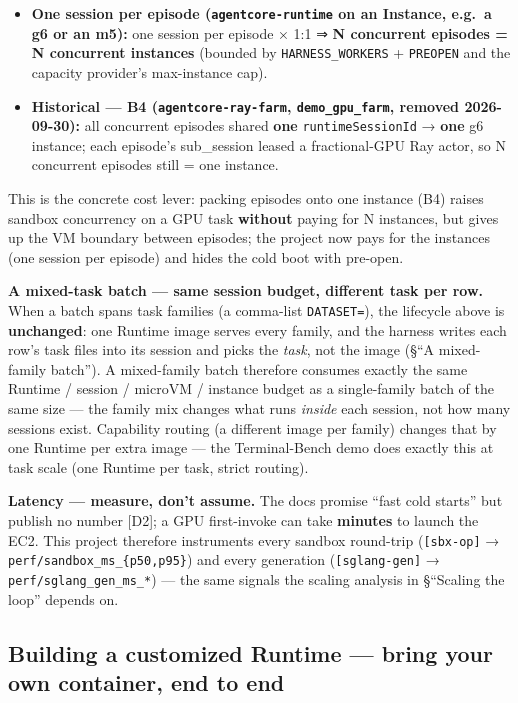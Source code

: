 \documentclass[
  paper=a4,
  ,captions=tableheading
]{scrartcl}
\providecommand{\tightlist}{%
  \setlength{\itemsep}{0pt}\setlength{\parskip}{0pt}}
\begin{document}
\begin{itemize}
\tightlist
\item
  \textbf{One session per episode (\texttt{agentcore-runtime} on an
  Instance, e.g.~a g6 or an m5):} one session per episode × 1:1 ⇒
  \textbf{N concurrent episodes = N concurrent instances} (bounded by
  \texttt{HARNESS\_WORKERS} + \texttt{PREOPEN} and the capacity
  provider's max-instance cap).
\item
  \textbf{Historical --- B4 (\texttt{agentcore-ray-farm},
  \texttt{demo\_gpu\_farm}, removed 2026-09-30):} all concurrent
  episodes shared \textbf{one} \texttt{runtimeSessionId} → \textbf{one}
  g6 instance; each episode's sub\_session leased a fractional-GPU Ray
  actor, so N concurrent episodes still = one instance.
\end{itemize}

This is the concrete cost lever: packing episodes onto one instance (B4)
raises sandbox concurrency on a GPU task \textbf{without} paying for N
instances, but gives up the VM boundary between episodes; the project
now pays for the instances (one session per episode) and hides the cold
boot with pre-open.

\textbf{A mixed-task batch --- same session budget, different task per
row.} When a batch spans task families (a comma-list \texttt{DATASET=}),
the lifecycle above is \textbf{unchanged}: one Runtime image serves
every family, and the harness writes each row's task files into its
session and picks the \emph{task}, not the image (§``A mixed-family
batch''). A mixed-family batch therefore consumes exactly the same
Runtime / session / microVM / instance budget as a single-family batch
of the same size --- the family mix changes what runs \emph{inside} each
session, not how many sessions exist. Capability routing (a different
image per family) changes that by one Runtime per extra image --- the
Terminal-Bench demo does exactly this at task scale (one Runtime per
task, strict routing).

\textbf{Latency --- measure, don't assume.} The docs promise ``fast cold
starts'' but publish no number {[}D2{]}; a GPU first-invoke can take
\textbf{minutes} to launch the EC2. This project therefore instruments
every sandbox round-trip (\texttt{{[}sbx-op{]}} →
\texttt{perf/sandbox\_ms\_\{p50,p95\}}) and every generation
(\texttt{{[}sglang-gen{]}} → \texttt{perf/sglang\_gen\_ms\_*}) --- the
same signals the scaling analysis in §``Scaling the loop'' depends on.

\hypertarget{building-a-customized-runtime-bring-your-own-container-end-to-end}{%
\subsection{Building a customized Runtime --- bring your own container,
end to
end}\label{building-a-customized-runtime-bring-your-own-container-end-to-end}}
\end{document}
